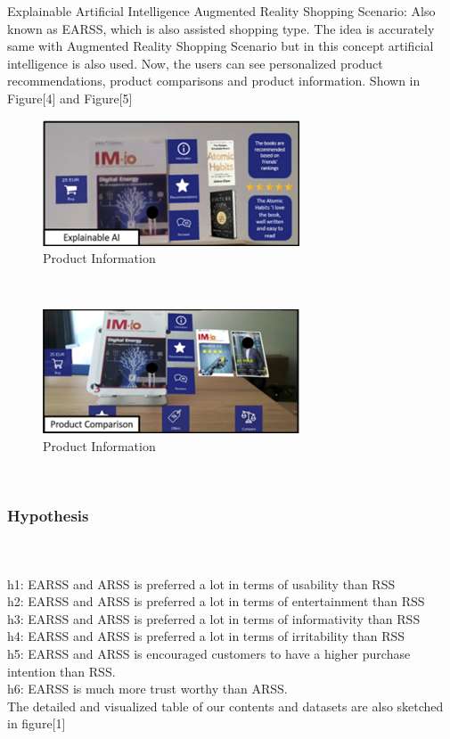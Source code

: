 \documentclass[letterpaper, 10 pt, conference]{ieeeconf}
\begin{document}
Explainable Artificial Intelligence Augmented Reality Shopping Scenario: Also known as EARSS, which is also assisted shopping type. The idea is accurately same with Augmented Reality Shopping Scenario but in this concept artificial intelligence is also used. Now, the users can see personalized product recommendations, product comparisons and product information. Shown in Figure[4] and Figure[5]\\
\begin{figure}[!ht]
    \centering
    \includegraphics{Picture4.png}
    \caption{Product Information}
\end{figure}\\
\begin{figure}[!ht]
    \centering
    \includegraphics{Picture5.png}
    \caption{Product Information}
\end{figure}\\


\subsubsection{Hypothesis}\hfill\\\hfill\\
h1: EARSS and ARSS is preferred a lot in terms of usability than RSS \\
h2: EARSS and ARSS is preferred a lot in terms of entertainment than RSS \\
h3: EARSS and ARSS is preferred a lot in terms of informativity than RSS \\
h4: EARSS and ARSS is preferred a lot in terms of irritability than RSS \\
h5: EARSS and ARSS is encouraged customers to have a higher purchase intention than RSS.\\
h6: EARSS is much more trust worthy than ARSS.\\
The detailed and visualized table of our contents and datasets are also sketched in figure[1]\\
\end{document}
